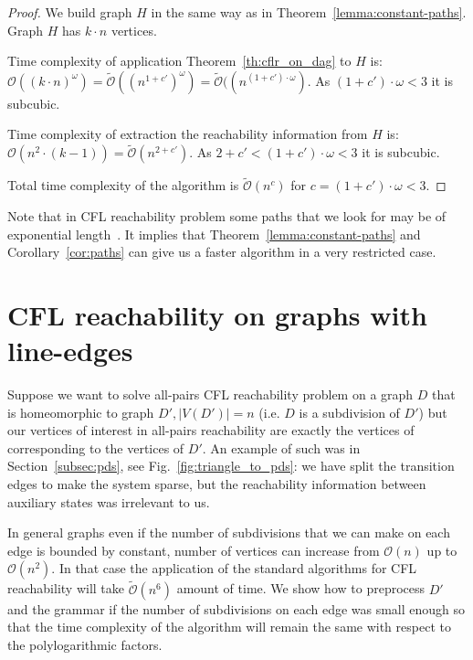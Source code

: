 \documentclass[12pt]{article}
\begin{document}
\begin{proof}
We build graph $H$ in the same way as in Theorem~\ref{lemma:constant-paths}. Graph $H$ has $k \cdot n$ vertices.

Time complexity of application Theorem~\ref{th:cflr_on_dag} to $H$ is: $\mathcal{O}((k \cdot n)^{\omega}) = \tilde{\mathcal{O}}((n^{1 + c'})^{\omega}) = \tilde{\mathcal{O}}((n^{(1 + c') \cdot \omega})$. As $(1 + c') \cdot \omega < 3$ it is subcubic.

Time complexity of extraction the reachability information from $H$ is: $\mathcal{O}(n^2 \cdot (k - 1)) = \tilde{\mathcal{O}}(n^{2 + c'})$. As $2 + c' < (1 + c') \cdot \omega < 3$ it is subcubic.

Total time complexity of the algorithm is $\tilde{\mathcal{O}}(n^c)$ for $c = (1 + c') \cdot \omega < 3$.
\end{proof}

Note that in CFL reachability problem some paths that we look for may be of exponential length~\cite{PIERRE1992279}. It implies that Theorem~\ref{lemma:constant-paths} and Corollary~\ref{cor:paths} can give us a faster algorithm in a very restricted case.

\section{CFL reachability on graphs with line-edges}
\label{sec:line_edges}

Suppose we want to solve all-pairs CFL reachability problem on a graph $D$ that is homeomorphic to graph $D', |V(D')|=n$ (i.e. $D$ is a subdivision of $D'$) but our vertices of interest in all-pairs reachability are exactly the vertices of corresponding to the vertices of $D'$. An example of such was in Section~\ref{subsec:pds}, see Fig.~\ref{fig:triangle_to_pds}: we have split the transition edges to make the system sparse, but the reachability information between auxiliary states was irrelevant to us. 

In general graphs even if the number of subdivisions that we can make on each edge is bounded by constant, number of vertices can increase from $\mathcal{O}(n)$ up to $\mathcal{O}(n^2)$. In that case the application of the standard algorithms for CFL reachability will take $\mathcal{\tilde O}(n^6)$ amount of time. We show how to preprocess $D'$ and the grammar if the number of subdivisions on each edge was small enough so that the time complexity of the algorithm will remain the same with respect to the polylogarithmic factors.
\end{document}
